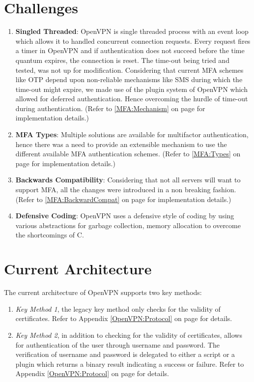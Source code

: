 \documentclass[11pt,oneside]{book}
\begin{document}
\section{Challenges}
\begin{enumerate}
    \item \textbf{Singled Threaded}: OpenVPN is single threaded process with an event loop which
        allows it to handled concurrent connection requests. Every request fires a timer in OpenVPN
        and if authentication does not succeed before the time quantum expires, the connection is
        reset. The time-out being tried and tested, was not up for modification.
        Considering that current MFA schemes like OTP depend upon non-reliable mechanisms like
        SMS during which the time-out might expire, we made use of the plugin system of OpenVPN
        which allowed for deferred authentication. Hence overcoming the hurdle of time-out
        during authentication.
        (Refer to \ref{MFA:Mechanism} on page \pageref{MFA:Mechanism} for implementation details.)
    \item \textbf{MFA Types}: Multiple solutions are available for multifactor authentication, hence
        there was a need to provide an extensible mechanism to use the different available MFA
        authentication schemes. (Refer to \ref{MFA:Types} on page \pageref{MFA:Types} for
        implementation details.)
    \item \textbf{Backwards Compatibility}: Considering that not all servers will want to support
        MFA, all the changes were introduced in a non breaking fashion.
        (Refer to \ref{MFA:BackwardCompat} on page \pageref{MFA:BackwardCompat} for implementation details.)
    \item \textbf{Defensive Coding}: OpenVPN uses a defensive style of coding by using various
        abstractions for garbage collection, memory allocation to overcome the shortcomings of C.
\end{enumerate}

\section{Current Architecture}
The current architecture of OpenVPN supports two key methods:

\begin{enumerate}
    \item \emph{Key Method 1}, the legacy key method only checks for the validity of certificates.
        Refer to Appendix \ref{OpenVPN:Protocol} on page \pageref{OpenVPN:Protocol} for details.
    \item \emph{Key Method 2}, in addition to checking for the validity of certificates, allows for
        authentication of the user through username and password. The verification of username and
        password is delegated to either a script or a plugin which returns a binary result
        indicating a success or failure.
        Refer to Appendix \ref{OpenVPN:Protocol} on page \pageref{OpenVPN:Protocol} for details.
\end{enumerate}
\end{document}
